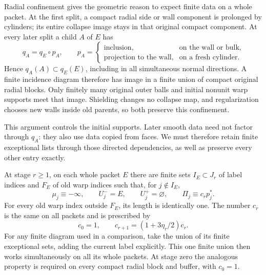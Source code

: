 Radial confinement gives the geometric reason to expect finite data on
a whole packet. At the first split, a compact radial side or wall
component is prolonged by cylinders; its entire collapse image stays
in that original compact component. At every later split a child $A$
of $E$ has
\begin{equation}\label{countable:collapse-recursion}
 q_A=q_E\circ p_A,\qquad
 p_A=\begin{cases}
 \text{inclusion},&\text{on the wall or bulk},\\
 \text{projection to the wall},&\text{on a fresh cylinder}.
 \end{cases}
\end{equation}
Hence $q_A(A)\subset q_E(E)$, including in all simultaneous normal
directions. A finite incidence diagram therefore has image in a finite
union of compact original radial blocks. Only finitely many original
outer balls and initial nonunit warp supports meet that image.
Shielding changes no collapse map, and regularization chooses new
walls inside old parents, so both preserve this confinement.

This argument controls the initial supports. Later smooth data need
not factor through $q_A$: they also use data copied from faces. We
must therefore retain finite exceptional lists through those directed
dependencies, as well as preserve every other entry exactly.

\begin{definition}\label{countable:finite-data}
At stage $r\ge1$, on each whole packet $E$ there are finite sets
$I_E\subset J_r$ of label indices and $F_E$ of old warp indices such
that, for $j\notin I_E$,
\begin{equation}\label{countable:passive}
 \mu_j\equiv-\infty,\qquad U_j^-=E,\qquad U_j^+=\varnothing,
 \qquad \Pi_j\equiv c_rp_j^*.
\end{equation}
For every old warp index outside $F_E$, its length is identically one.
The number $c_r$ is the same on all packets and is prescribed by
\begin{equation}\label{countable:passive-multiplier}
 c_0=1,\qquad c_{r+1}=(1+3\eta_r/2)c_r.
\end{equation}
For any finite diagram used in a comparison, take the union of its
finite exceptional sets, adding the current label explicitly. This
one finite union then works simultaneously on all its whole packets.
At stage zero the analogous property is required on every compact
radial block and buffer, with $c_0=1$.
\end{definition}

